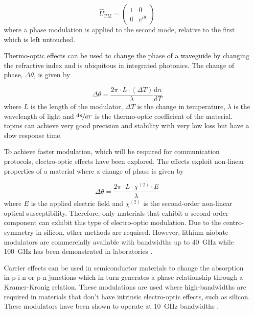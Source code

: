 \begin{equation}
	\hat{U}_\mathrm{PM} = \left(
	\begin{matrix}
	1 & 0\\
	0 & e^{i\theta}
	\end{matrix}
	\right)
\end{equation}
where a phase modulation is applied to the second mode, relative to the first which is left untouched.

Thermo-optic effects can be used to change the phase of a waveguide by changing the refractive index and is ubiquitous in integrated photonics. The change of phase, $\Delta\theta$, is given by

\begin{equation}
	\Delta\theta = \frac{2\pi\cdot L\cdot (\Delta T)}{\lambda}\frac{\mathrm{d}n}{\mathrm{d}T}
\end{equation}
where $L$ is the length of the modulator, $\Delta T$ is the change in temperature, $\lambda$ is the wavelength of light and $\nicefrac{\mathrm{d}n}{\mathrm{d}T}$ is the thermo-optic coefficient of the material. \Acp{topm} can achieve very good precision and stability with very low loss but have a slow response time. 

To achieve faster modulation, which will be required for communication protocols, electro-optic effects have been explored. The effects exploit non-linear properties of a material where a change of phase is given by

\begin{equation}
	\Delta\theta = \frac{2\pi\cdot L\cdot  \chi^{(2)}\cdot E}{\lambda}
\end{equation}
where $E$ is the applied electric field and $\chi^{(2)}$ is the second-order non-linear optical susceptibility. Therefore, only materials that exhibit a second-order component can exhibit this type of electro-optic modulation. Due to the centro-symmetry in silicon, other methods are required. However, lithium niobate modulators are commercially available with bandwidths up to \SI{40}{GHz} while \SI{100}{GHz} has been demonstrated in laboratories \cite{Louay2001Advances, Atsushi2010NRZ}.

Carrier effects can be used in semiconductor materials to change the absorption in p-i-n or p-n junctions which in turn generates a phase relationship through a Kramer-Kronig relation. These modulations are used where high-bandwidths are required in materials that don't have intrinsic electro-optic effects, such as silicon. These modulators have been shown to operate at \SI{10}{GHz} bandwidths \cite{Sibson2017Si}.

